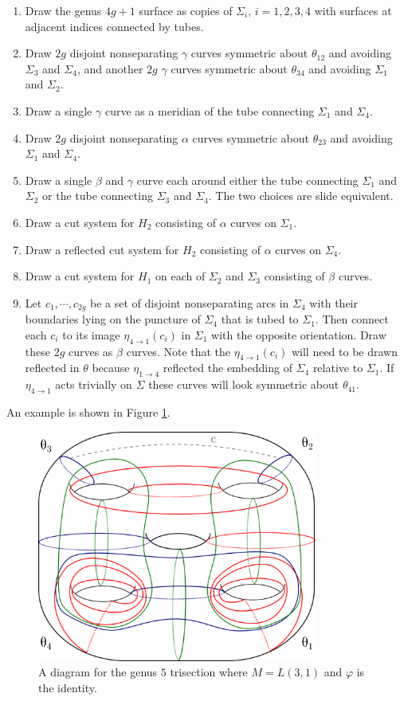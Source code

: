 \documentclass[12pt]{amsart}
\theoremstyle{definition}
\theoremstyle{remark}
\begin{document}
\begin{enumerate}
\item Draw the genus $4g+1$ surface as copies of $\Sigma_i$, $i = 1,2,3,4$ with surfaces at adjacent indices connected by tubes.
\item Draw $2g$ disjoint nonseparating $\gamma$ curves symmetric about $\theta_{12}$ and avoiding $\Sigma_3$ and $\Sigma_4$, and another $2g$ $\gamma$ curves symmetric about $\theta_{34}$ and avoiding $\Sigma_1$ and $\Sigma_2$.
\item Draw a single $\gamma$ curve as a meridian of the tube connecting $\Sigma_1$ and $\Sigma_4$.
\item Draw $2g$ disjoint nonseparating $\alpha$ curves symmetric about $\theta_{23}$ and avoiding $\Sigma_1$ and $\Sigma_4$.
\item Draw a single $\beta$ and $\gamma$ curve each around either the tube connecting $\Sigma_1$ and $\Sigma_2$ or the tube connecting $\Sigma_3$ and $\Sigma_4$.
The two choices are slide equivalent.
\item Draw a cut system for $H_2$ consisting of $\alpha$ curves on $\Sigma_1$.
\item Draw a reflected cut system for $H_2$ consisting of $\alpha$ curves on $\Sigma_4$.
\item Draw a cut system for $H_1$ on each of $\Sigma_2$ and $\Sigma_3$ consisting of $\beta$ curves.
\item Let $c_1,\cdots,c_{2g}$ be a set of disjoint nonseparating arcs in $\Sigma_4$ with their boundaries lying on the puncture of $\Sigma_4$ that is tubed to $\Sigma_1$.
Then connect each $c_i$ to its image $\eta_{4 \to 1}(c_i)$ in $\Sigma_1$ with the opposite orientation.
Draw these $2g$ curves as $\beta$ curves.
Note that the $\eta_{4 \to 1}(c_i)$ will need to be drawn reflected in $\theta$ because $\eta_{1 \to 4}$ reflected the embedding of $\Sigma_4$ relative to $\Sigma_1$.
If $\eta_{4 \to 1}$ acts trivially on $\Sigma$ these curves will look symmetric about $\theta_{41}$.
\end{enumerate}

An example is shown in Figure \ref{unbalancedex}.



\begin{figure}[h]
\centering
\includegraphics[height=3in]{LxS12.png}
\caption{A diagram for the genus $5$ trisection where $M = L(3,1)$ and $\varphi$ is the identity.
}
\label{unbalancedex}
\end{figure}
\end{document}
